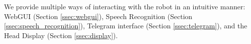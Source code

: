 We provide multiple ways of interacting with the robot in an intuitive manner: WebGUI (Section \ref{ssec:webgui}), Speech Recognition (Section \ref{ssec:speech_recognition}), Telegram\texttrademark\hspace{0em} interface (Section \ref{ssec:telegram}), and the Head Display (Section \ref{ssec:display}).
